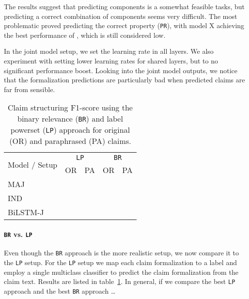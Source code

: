 The results suggest that predicting components is a somewhat feasible tasks,
but predicting a correct combination of components seems very difficult.  The
most problematic proved predicting the correct property (\texttt{PR}), with
model X achieving the best performance of , which is still considered low. 

In the joint model setup, we set the learning rate in all layers. 
We also experiment with setting lower learning rates for shared layers,
but to no significant performance boost. 
Looking into the joint model outputs, we notice that the formalization predictions
are particularly bad when predicted claims are far from sensible. 

\begin{table}
	\centering
	\begin{tabular}{p{3cm} c c c c }
	\toprule
		\multirow{2}{*}{Model / Setup}
		& \multicolumn{2}{c}{\texttt{LP}}
		& \multicolumn{2}{c}{\texttt{BR}}
		\\
		& OR  & PA  & OR  & PA \\
		\midrule

		MAJ & & & &  \\
		IND & & & & \\		
		BiLSTM-J & & & & \\

		\bottomrule
	\end{tabular}
	\caption{Claim structuring
	F1-score using the 
	binary relevance (\texttt{BR}) 
	and label powerset (\texttt{LP}) 
	approach for original (OR) and paraphrased (PA) claims. 
	}
	\label{tab:claim_struc_atomic_molecular}
\end{table}

\paragraph{\texttt{BR} vs. \texttt{LP} } Even though the
\texttt{BR} approach is the more realistic setup, we now compare it
to the \texttt{LP} setup. For the \texttt{LP} setup
we map each claim formalization to a label and employ a single multiclass
classifier to predict the claim formalization from the claim text.
Results are listed in table~\ref{tab:claim_struc_atomic_molecular}.
In general, if we compare the best \texttt{LP} approach and
the best \texttt{BR} approach \dots
{}

